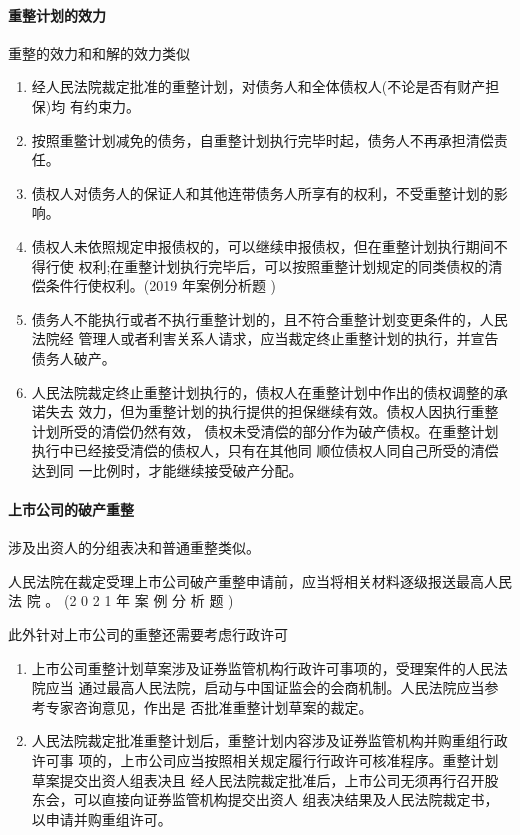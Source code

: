 \documentclass[UTF8,12pt]{ctexart}
\numberwithin{equation}{section} %
\numberwithin{figure}{section}
\numberwithin{table}{section}
\begin{document}
	\paragraph{重整计划的效力}
	重整的效力和和解的效力类似
	\begin{enumerate}
		\item 经人民法院裁定批准的重整计划，对债务人和全体债权人(不论是否有财产担保)均 有约束力。
		
		\item 按照重鳖计划减免的债务，自重整计划执行完毕时起，债务人不再承担清偿责任。
		
		\item 债权人对债务人的保证人和其他连带债务人所享有的权利，不受重整计划的影响。
		
		\item 债权人未依照规定申报债权的，可以继续申报债权，但在重整计划执行期间不得行使 权利;在重整计划执行完毕后，可以按照重整计划规定的同类债权的清偿条件行使权利。(2019 年案例分析题 )
		
		\item 债务人不能执行或者不执行重整计划的，且不符合重整计划变更条件的，人民法院经 管理人或者利害关系人请求，应当裁定终止重整计划的执行，并宣告债务人破产。
		
		\item 人民法院裁定终止重整计划执行的，债权人在重整计划中作出的债权调整的承诺失去 效力，但为重整计划的执行提供的担保继续有效。债权人因执行重整计划所受的清偿仍然有效， 债权未受清偿的部分作为破产债权。在重整计划执行中已经接受清偿的债权人，只有在其他同 顺位债权人同自己所受的清偿达到同 一比例时，才能继续接受破产分配。
	\end{enumerate}
	
	
	\paragraph{上市公司的破产重整}
	涉及出资人的分组表决和普通重整类似。
	
	人民法院在裁定受理上市公司破产重整申请前，应当将相关材料逐级报送最高人民法 院 。 (2 0 2 1 年 案 例 分 析 题 )
	
	此外针对上市公司的重整还需要考虑行政许可
	\begin{enumerate}
		\item 上市公司重整计划草案涉及证券监管机构行政许可事项的，受理案件的人民法院应当 通过最高人民法院，启动与中国证监会的会商机制。人民法院应当参考专家咨询意见，作出是 否批准重整计划草案的裁定。 
		
		\item 人民法院裁定批准重整计划后，重整计划内容涉及证券监管机构并购重组行政许可事 项的，上市公司应当按照相关规定履行行政许可核准程序。重整计划草案提交出资人组表决且 经人民法院裁定批准后，上市公司无须再行召开股东会，可以直接向证券监管机构提交出资人 组表决结果及人民法院裁定书，以申请并购重组许可。
	\end{enumerate}
	
\end{document}
